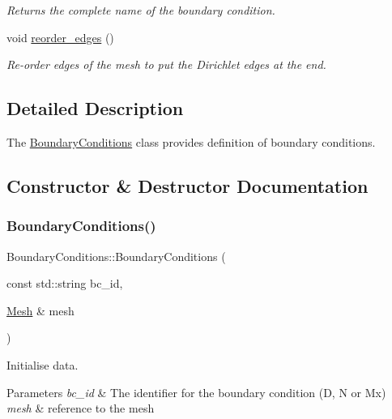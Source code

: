 \begin{DoxyCompactItemize}
\begin{DoxyCompactList}\small\item\em Returns the complete name of the boundary condition. \end{DoxyCompactList}\item 
\mbox{\label{classBoundaryConditions_ad3d79d4870a388b5e796c3bb25891e59}} 
void \hyperlink{classBoundaryConditions_ad3d79d4870a388b5e796c3bb25891e59}{reorder\+\_\+edges} ()
\begin{DoxyCompactList}\small\item\em Re-\/order edges of the mesh to put the Dirichlet edges at the end. \end{DoxyCompactList}\end{DoxyCompactItemize}


\subsection{Detailed Description}
The \hyperlink{classBoundaryConditions}{Boundary\+Conditions} class provides definition of boundary conditions. 

\subsection{Constructor \& Destructor Documentation}
\mbox{\label{classBoundaryConditions_a5f9b50ca35f0fcee51e84e015223396c}} 
\subsubsection{\texorpdfstring{Boundary\+Conditions()}{BoundaryConditions()}}
{\footnotesize\ttfamily Boundary\+Conditions\+::\+Boundary\+Conditions (\begin{DoxyParamCaption}\item[{const std\+::string}]{bc\+\_\+id,  }\item[{\hyperlink{classHArDCore2D_1_1Mesh}{Mesh} \&}]{mesh }\end{DoxyParamCaption})}



Initialise data. 


\begin{DoxyParams}{Parameters}
{\em bc\+\_\+id} & The identifier for the boundary condition (D, N or Mx) \\
\hline
{\em mesh} & reference to the mesh \\
\hline
\end{DoxyParams}


